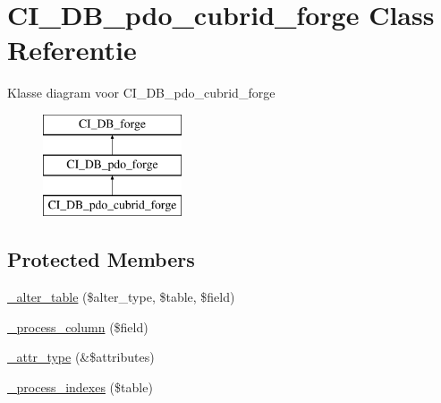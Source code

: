 \hypertarget{class_c_i___d_b__pdo__cubrid__forge}{}\section{C\+I\+\_\+\+D\+B\+\_\+pdo\+\_\+cubrid\+\_\+forge Class Referentie}
\label{class_c_i___d_b__pdo__cubrid__forge}
Klasse diagram voor C\+I\+\_\+\+D\+B\+\_\+pdo\+\_\+cubrid\+\_\+forge\begin{figure}[H]
\begin{center}
\leavevmode
\includegraphics[height=3.000000cm]{class_c_i___d_b__pdo__cubrid__forge}
\end{center}
\end{figure}
\subsection*{Protected Members}
\begin{DoxyCompactItemize}
\item 
\mbox{\hyperlink{class_c_i___d_b__pdo__cubrid__forge_a41c6cae02f2fda8b429ad0afb9509426}{\+\_\+alter\+\_\+table}} (\$alter\+\_\+type, \$table, \$field)
\item 
\mbox{\hyperlink{class_c_i___d_b__pdo__cubrid__forge_a8f38f1c5b5dddecca4befbe393f3f299}{\+\_\+process\+\_\+column}} (\$field)
\item 
\mbox{\hyperlink{class_c_i___d_b__pdo__cubrid__forge_a8553be952084c6f7cdfff370a1d14f6b}{\+\_\+attr\+\_\+type}} (\&\$attributes)
\item 
\mbox{\hyperlink{class_c_i___d_b__pdo__cubrid__forge_ae0bdb4ea3418590d1894c5b621b5ca50}{\+\_\+process\+\_\+indexes}} (\$table)
\end{DoxyCompactItemize}
